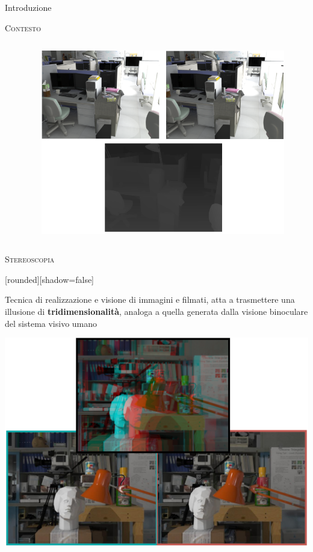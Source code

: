 \documentclass{beamer}
\begin{document}
\begin{section}{Introduzione}
\begin{frame}[t]{\textsc{Contesto}}
\begin{columns}
\begin{column}{4cm}
\begin{center}
\end{center}
\end{column}
\begin{column}{6cm}
\begin{figure}
\centering
\includegraphics[width=1\linewidth]{./img/track.png}
\end{figure}
\end{column}
\end{columns}
\end{frame}


\begin{frame}[t]{\textsc{Stereoscopia}}
\vspace{-1em}
\begin{center}
	[rounded][shadow=false]
\begin{block}{}
	\center Tecnica di realizzazione e visione di immagini e filmati, atta a trasmettere una illusione di \textbf{tridimensionalit\`{a}}, analoga a quella generata dalla visione binoculare del sistema visivo umano
	\end{block}
\end{center}
\begin{center}
\vspace{-0.3em}
\includegraphics[width=0.7\linewidth]{./img/stereo.png}
\end{center}
\end{frame}


\end{section}
\end{document}
